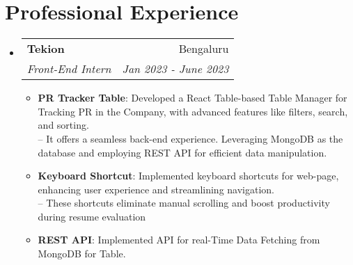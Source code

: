 \documentclass[a4paper,20pt]{article}
\makeatletter
\newcommand{\resumeItem}[2]{
  \item\small{
    \textbf{#1}{: #2 \vspace{-2pt}}
  }
}
\newcommand{\resumeSubheading}[4]{
  \vspace{-1pt}\item
    \begin{tabular*}{0.97\textwidth}{l@{\extracolsep{\fill}}r}
      \textbf{#1} & #2 \\
      \textit{#3} & \textit{#4} \\
    \end{tabular*}\vspace{-5pt}
}
\newcommand{\resumeSubHeadingListStart}{\begin{itemize}[leftmargin=*]}
\newcommand{\resumeSubHeadingListEnd}{\end{itemize}}
\newcommand{\resumeItemListStart}{\begin{itemize}}
\newcommand{\resumeItemListEnd}{\end{itemize}\vspace{-5pt}}
\makeatother
\begin{document}
\section{Professional Experience}
  \resumeSubHeadingListStart
    \resumeSubheading{Tekion}{Bengaluru}
    {Front-End Intern}{Jan 2023 - June 2023}
    \resumeItemListStart
        \resumeItem{PR Tracker Table}
          {Developed a React Table-based Table Manager for Tracking PR in the Company, with advanced features like filters, search, and sorting.
          \vspace{2pt}
          \\ {--}
          It offers a seamless back-end experience. Leveraging MongoDB as the database and employing REST API for efficient data manipulation.}
          \vspace{3pt}
          \resumeItem{Keyboard Shortcut}
          {Implemented keyboard shortcuts for web-page, enhancing user experience and streamlining navigation.
          \\
          \vspace{2pt}
          {--}
          These shortcuts eliminate manual scrolling and boost productivity during resume evaluation}
          \resumeItem{REST API}{Implemented API for real-Time Data Fetching from MongoDB for Table.}
      \resumeItemListEnd

\resumeSubHeadingListEnd
\vspace{5pt}
\end{document}
